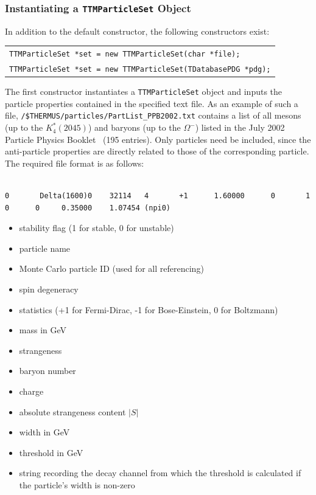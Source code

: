 \documentclass{elsarticle}
\begin{document}
\subsubsection{Instantiating a \texttt{TTMParticleSet} Object}

In addition to the default constructor, the following constructors exist:

\begin{center}
\begin{tabular}{l}
\texttt{TTMParticleSet *set = new TTMParticleSet(char *file);}\\
\texttt{TTMParticleSet *set = new TTMParticleSet(TDatabasePDG *pdg);}
\end{tabular}
\end{center}
 
The first constructor instantiates a \texttt{TTMParticleSet} object and inputs the particle properties 
contained in the specified text file. As an example of such a file, 
\texttt{/\$THERMUS/particles/PartList\_PPB2002.txt} contains a list 
of all mesons (up to the $K_4^*(2045)$) and baryons (up to the $\Omega^-$) 
listed in the July 2002 Particle Physics Booklet~\cite{Hagiwara:2002fs} (195 entries). Only particles 
need be included, since the anti-particle properties are directly related to 
those of the corresponding particle. The required file format is as follows:

\small
\begin{verbatim}

0       Delta(1600)0    32114   4       +1      1.60000      0       1       
0      0     0.35000    1.07454 (npi0)

\end{verbatim}
\normalsize

\begin{itemize}
\item{stability flag (1 for stable, 0 for unstable)}
\item{particle name}
\item{Monte Carlo particle ID (used for all referencing)}
\item{spin degeneracy}
\item{statistics (+1 for Fermi-Dirac, -1 for 
Bose-Einstein, 0 for Boltzmann)}
\item{mass in GeV}
\item{strangeness}
\item{baryon number}
\item{charge}
\item{absolute strangeness content $\left|{S}\right|$}
\item{width in GeV}
\item{threshold in GeV}
\item{string recording the decay channel from which the threshold is calculated if the particle's width is non-zero}
\end{itemize}
\end{document}

